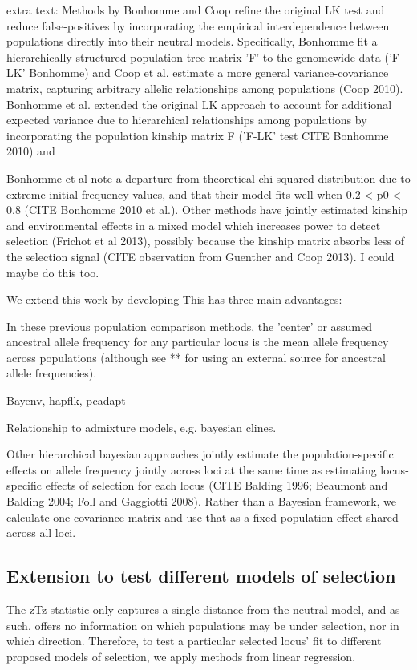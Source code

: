 \documentclass[12pt]{report}
\begin{document}
extra text:
Methods by Bonhomme and Coop refine the original LK test and reduce false-positives by incorporating the empirical interdependence between populations directly into their neutral models. Specifically, Bonhomme fit a hierarchically structured population tree matrix 'F' to the genomewide data ('F-LK' Bonhomme) and Coop et al. estimate a more general variance-covariance matrix, capturing arbitrary allelic relationships among populations (Coop 2010). Bonhomme et al. extended the original LK approach to account for additional expected variance due to hierarchical relationships among populations by incorporating the population kinship matrix F ('F-LK' test CITE Bonhomme 2010) and  


Bonhomme et al note a departure from theoretical chi-squared distribution due to extreme initial frequency values, and that their model fits well when 0.2 < p0 < 0.8 (CITE Bonhomme 2010 et al.).
Other methods have jointly estimated kinship and environmental effects in a mixed model which increases power to detect selection (Frichot et al 2013), possibly because the kinship matrix absorbs less of the selection signal (CITE observation from Guenther and Coop 2013). I could maybe do this too.

We extend this work by developing 
This has three main advantages:

In these previous population comparison methods, the 'center' or assumed ancestral allele frequency for any particular locus is the mean allele frequency across populations (although see ** for using an external source for ancestral allele frequencies). 

Bayenv, hapflk, pcadapt

Relationship to admixture models, e.g. bayesian clines.

Other hierarchical bayesian approaches jointly estimate the population-specific effects on allele frequency jointly across loci at the same time as estimating locus-specific effects of selection for each locus (CITE Balding 1996; Beaumont and Balding 2004; Foll and Gaggiotti 2008). Rather than a Bayesian framework, we calculate one covariance matrix and use that as a fixed population effect shared across all loci.

\subsection{Extension to test different models of selection}

The zTz statistic only captures a single distance from the neutral model, and as such, offers no information on which populations may be under selection, nor in which direction. Therefore, to test a particular selected locus' fit to different proposed models of selection, we apply methods from linear regression. 
\end{document}
